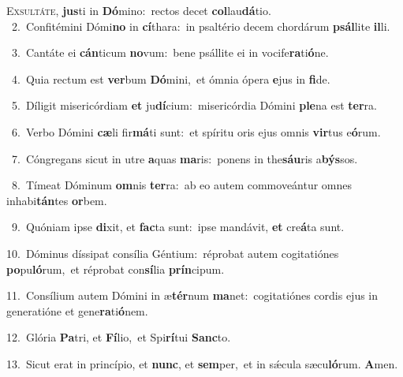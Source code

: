 \lettrine{\initial\textcolor{\initialcolor}{E}}{xsultáte,} \textbf{jus}\-ti in \textbf{Dó}\-mino:~\star rectos decet \textbf{col}\-lau\-\textbf{dá}\-tio.\\
{\numbfont\textcolor{\numbcolor}{~2.}}~Confitémini Dómi\textbf{no} in \textbf{cí}\-thara:~\star in psaltério decem chordárum \textbf{psál}\-lite \textbf{il}\-li.\par
{\numbfont\textcolor{\numbcolor}{~3.}}~Cantáte ei \textbf{cán}\-ticum \textbf{no}\-vum:~\star bene psállite ei in vocife\-\textbf{ra}\-ti\-\textbf{ó}\-ne.\par
{\numbfont\textcolor{\numbcolor}{~4.}}~Quia rectum est \textbf{ver}\-bum \textbf{Dó}\-mini,~\star et ómnia ópera \textbf{e}\-jus in \textbf{fi}\-de.\par
{\numbfont\textcolor{\numbcolor}{~5.}}~Díligit misericórdiam \textbf{et} ju\-\textbf{dí}\-cium:~\star misericórdia Dómini \textbf{ple}\-na est \textbf{ter}\-ra.\par
{\numbfont\textcolor{\numbcolor}{~6.}}~Verbo Dómini \textbf{cæ}\-li fir\-\textbf{má}\-ti sunt:~\star et spíritu oris ejus omnis \textbf{vir}\-tus e\-\textbf{ó}\-rum.\par
{\numbfont\textcolor{\numbcolor}{~7.}}~Cóngregans sicut in utre \textbf{a}\-quas \textbf{ma}\-ris:~\star ponens in the\-\textbf{sáu}\-ris a\-\textbf{býs}\-sos.\par
{\numbfont\textcolor{\numbcolor}{~8.}}~Tímeat Dóminum \textbf{om}\-nis \textbf{ter}\-ra:~\star ab eo autem commoveántur omnes inhabi\-\textbf{tán}\-tes \textbf{or}\-bem.\par
{\numbfont\textcolor{\numbcolor}{~9.}}~Quóniam ipse \textbf{di}\-xit, et \textbf{fac}\-ta sunt:~\star ipse mandávit, \textbf{et} cre\-\textbf{á}\-ta sunt.\par
{\numbfont\textcolor{\numbcolor}{10.}}~Dóminus díssipat consília Géntium:~\dagger réprobat autem cogitatiónes \textbf{po}\-pu\-\textbf{ló}\-rum,~\star et réprobat con\-\textbf{sí}\-lia \textbf{prín}\-cipum.\par
{\numbfont\textcolor{\numbcolor}{11.}}~Consílium autem Dómini in æ\-\textbf{tér}\-num \textbf{ma}\-net:~\star cogitatiónes cordis ejus in generatióne et gene\-\textbf{ra}\-ti\-\textbf{ó}\-nem.\par
{\numbfont\textcolor{\numbcolor}{12.}}~Glória \textbf{Pa}\-tri, et \textbf{Fí}\-lio,~\star et Spi\-\textbf{rí}\-tui \textbf{Sanc}\-to.\par
{\numbfont\textcolor{\numbcolor}{13.}}~Sicut erat in princípio, et \textbf{nunc}\-, et \textbf{sem}\-per,~\star et in sǽcula sæcu\-\textbf{ló}\-rum. \textbf{A}\-men.\par
